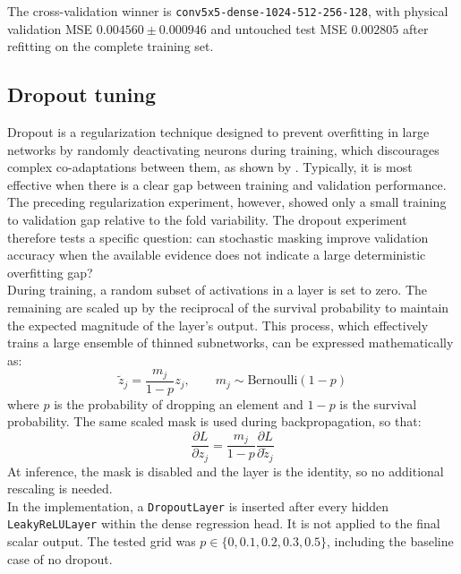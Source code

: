 The cross-validation winner is \texttt{conv5x5-dense-1024-512-256-128}, with physical validation MSE $0.004560\pm0.000946$ and untouched test MSE $0.002805$ after refitting on the complete training set. 

\subsection{Dropout tuning}
\label{sec:04_dropout_tuning}

Dropout is a regularization technique designed to prevent overfitting in large networks by randomly deactivating neurons during training, which discourages complex co-adaptations between them, as shown by \cite{srivastava2014dropout}. Typically, it is most effective when there is a clear gap between training and validation performance. The preceding regularization experiment, however, showed only a small training to validation gap relative to the fold variability. The dropout experiment therefore tests a specific question: can stochastic masking improve validation accuracy when the available evidence does not indicate a large deterministic overfitting gap?\\

During training, a random subset of activations in a layer is set to zero. The remaining are scaled up by the reciprocal of the survival probability to maintain the expected magnitude of the layer's output. This process, which effectively trains a large ensemble of thinned subnetworks, can be expressed mathematically as:
\begin{equation}
    \widetilde{z}_j = \frac{m_j}{1-p}z_j,
    \qquad m_j\sim\mathrm{Bernoulli}(1-p)
    \label{eq:04_dropout}
\end{equation}
where $p$ is the probability of dropping an element and $1-p$ is the survival probability. The same scaled mask is used during backpropagation, so that:
\begin{equation}
    \frac{\partial L}{\partial z_j} =
    \frac{m_j}{1-p}\frac{\partial L}{\partial\widetilde{z}_j}
    \label{eq:04_dropout_backward}
\end{equation}
At inference, the mask is disabled and the layer is the identity, so no additional rescaling is needed.\\     

In the implementation, a \texttt{DropoutLayer} is inserted after every hidden \texttt{LeakyReLULayer} within the dense regression head. It is not applied to the final scalar output. The tested grid was $p\in\{0,0.1,0.2,0.3,0.5\}$, including the baseline case of no dropout.\\


